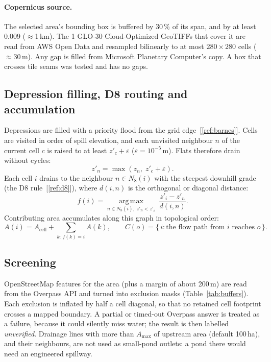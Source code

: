 \documentclass[11pt,a4paper]{article}
\begin{document}
\paragraph{Copernicus source.} The selected area's bounding box is buffered by 30\,\% of its span, and by at least 0.009\textdegree{} ($\approx$1\,km). The 1\textdegree{} GLO-30 Cloud-Optimized GeoTIFFs that cover it are read from AWS Open Data and resampled bilinearly to at most $280\times280$ cells ($\approx$30\,m). Any gap is filled from Microsoft Planetary Computer's copy. A box that crosses tile seams was tested and has no gaps.

\subsection{Depression filling, D8 routing and accumulation}
Depressions are filled with a priority flood from the grid edge~[\ref{ref:barnes}]. Cells are visited in order of spill elevation, and each unvisited neighbour $n$ of the current cell $c$ is raised to at least $z'_c+\varepsilon$ ($\varepsilon=10^{-5}$\,m). Flats therefore drain without cycles:
\begin{equation}
z'_n = \max\left(z_n,\; z'_c + \varepsilon\right).
\label{eq:flood}
\end{equation}
Each cell $i$ drains to the neighbour $n\in N_8(i)$ with the steepest downhill grade (the D8 rule~[\ref{ref:d8}]), where $d(i,n)$ is the orthogonal or diagonal distance:
\begin{equation}
f(i) = \underset{n\in N_8(i),\;z'_n<z'_i}{\operatorname{arg\,max}}\;\frac{z'_i-z'_n}{d(i,n)}.
\label{eq:d8}
\end{equation}
Contributing area accumulates along this graph in topological order:
\begin{equation}
A(i) = A_{\mathrm{cell}} + \sum_{k:\,f(k)=i} A(k),\qquad C(o)=\{\,i : \text{the flow path from } i \text{ reaches } o\,\}.
\label{eq:acc}
\end{equation}

\subsection{Screening}
OpenStreetMap features for the area (plus a margin of about 200\,m) are read from the Overpass API and turned into exclusion masks (Table~\ref{tab:buffers}). Each exclusion is inflated by half a cell diagonal, so that no retained cell footprint crosses a mapped boundary. A partial or timed-out Overpass answer is treated as a failure, because it could silently miss water; the result is then labelled \emph{unverified}. Drainage lines with more than $A_{\max}$ of upstream area (default 100\,ha), and their neighbours, are not used as small-pond outlets: a pond there would need an engineered spillway.
\end{document}
